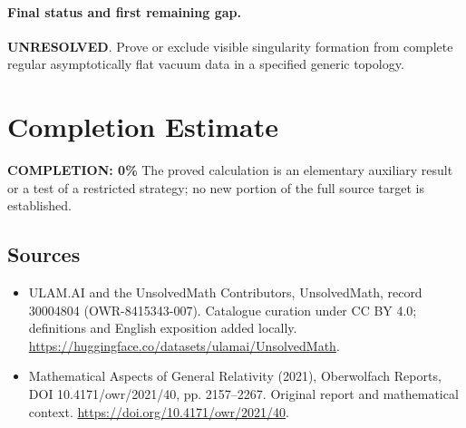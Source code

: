 \documentclass[11pt]{article}
\begin{document}
\paragraph{Final status and first remaining gap.}
\textbf{UNRESOLVED}. Prove or exclude visible singularity formation from complete regular asymptotically flat vacuum data in a specified generic topology.

\section{Completion Estimate}
\noindent\textbf{COMPLETION: 0\%}
The proved calculation is an elementary auxiliary result or a test of a restricted strategy; no new portion of the full source target is established.

\subsection{Sources}
\begin{itemize}
\item[\hypertarget{source:30004804:1}{S1}] ULAM.AI and the UnsolvedMath Contributors, UnsolvedMath, record 30004804 (OWR-8415343-007). Catalogue curation under CC BY 4.0; definitions and English exposition added locally.
\url{https://huggingface.co/datasets/ulamai/UnsolvedMath}.
\item[\hypertarget{source:30004804:2}{S2}] Mathematical Aspects of General Relativity (2021), Oberwolfach Reports, DOI 10.4171/owr/2021/40, pp. 2157--2267. Original report and mathematical context.
\url{https://doi.org/10.4171/owr/2021/40}.
\end{itemize}
\label{end:30004804}
\end{document}
